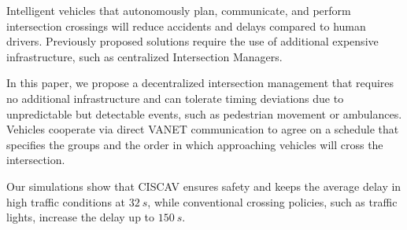 Intelligent vehicles that autonomously plan, communicate, and perform intersection crossings will reduce accidents and delays compared to human drivers.
Previously proposed solutions require the use of additional expensive infrastructure, such as centralized Intersection Managers.

In this paper, we propose a decentralized intersection management that requires no additional infrastructure and can tolerate timing deviations due to unpredictable but detectable events, such as pedestrian movement or ambulances. 
Vehicles cooperate via direct VANET communication to agree on a schedule that specifies the groups and the order in which approaching vehicles will cross the intersection. 

Our simulations show that CISCAV ensures safety and keeps the average delay in high traffic conditions at $\SI{32}{s}$, while conventional crossing policies, such as traffic lights, increase the delay up to $\SI{150}{s}$.